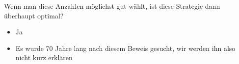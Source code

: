 \begin{frame}{Wenn man diese Anzahlen möglichst gut wählt, ist diese Strategie dann überhaupt optimal?}
    \begin{itemize}
        \item Ja
        \item Es wurde 70 Jahre lang nach diesem Beweis gesucht, wir werden ihn also nicht \glqq kurz \grqq erklären
    \end{itemize}
\end{frame}
